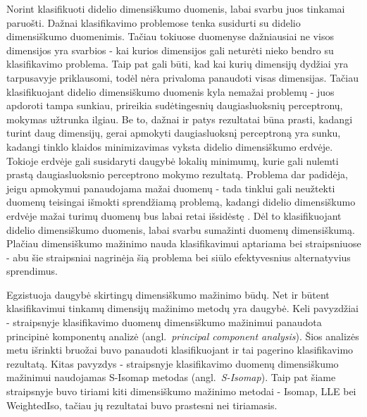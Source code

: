\documentclass{VUMIFPSbakalaurinis}
\begin{document}
Norint klasifikuoti didelio dimensiškumo duomenis, labai svarbu juos tinkamai paruošti.
Dažnai klasifikavimo problemose tenka susidurti su didelio dimensiškumo duomenimis.
Tačiau tokiuose duomenyse dažniausiai ne visos dimensijos yra svarbios - kai kurios dimensijos gali neturėti nieko bendro su klasifikavimo problema.
Taip pat gali būti, kad kai kurių dimensijų dydžiai yra tarpusavyje priklausomi, todėl nėra privaloma panaudoti visas dimensijas.
Tačiau klasifikuojant didelio dimensiškumo duomenis kyla nemažai problemų - juos apdoroti tampa sunkiau, prireikia sudėtingesnių daugiasluoksnių perceptronų, mokymas užtrunka ilgiau.
Be to, dažnai ir patys rezultatai būna prasti, kadangi turint daug dimensijų, gerai apmokyti daugiasluoksnį perceptroną yra sunku, kadangi tinklo klaidos minimizavimas vyksta didelio dimensiškumo erdvėje.
Tokioje erdvėje gali susidaryti daugybė lokalių minimumų, kurie gali nulemti prastą daugiasluoksnio perceptrono mokymo rezultatą.
Problema dar padidėja, jeigu apmokymui panaudojama mažai duomenų - tada tinklui gali neužtekti duomenų teisingai išmokti sprendžiamą problemą, kadangi didelio dimensiškumo erdvėje mažai turimų duomenų bus labai retai išsidėstę \cite[2455~psl.]{spectra}.
Dėl to klasifikuojant didelio dimensiškumo duomenis, labai svarbu sumažinti duomenų dimensiškumą.
Plačiau dimensiškumo mažinimo nauda klasifikavimui aptariama \cite[2455~psl.]{spectra} bei \cite[296~psl.]{ann-feature-extraction} straipsniuose - abu šie straipsniai nagrinėja šią problema bei siūlo efektyvesnius alternatyvius sprendimus.

Egzistuoja daugybė skirtingų dimensiškumo mažinimo būdų.
Net ir būtent klasifikavimui tinkamų dimensijų mažinimo metodų yra daugybė.
Keli pavyzdžiai - \cite[1517~psl.]{pca-classification} straipsnyje klasifikavimo duomenų dimensiškumo mažinimui panaudota principinė komponentų analizė (angl.~\textit{principal component analysis}).
Šios analizės metu išrinkti bruožai buvo panaudoti klasifikuojant ir tai pagerino klasifikavimo rezultatą.
Kitas pavyzdys - \cite[1098~psl.]{s-isomap-classification} straipsnyje klasifikavimo duomenų dimensiškumo mažinimui naudojamas S-Isomap metodas (angl.~\textit{S-Isomap}).
Taip pat šiame straipsnyje buvo tiriami kiti dimensiškumo mažinimo metodai - Isomap, LLE bei WeightedIso, tačiau jų rezultatai buvo prastesni nei tiriamasis.
\end{document}
